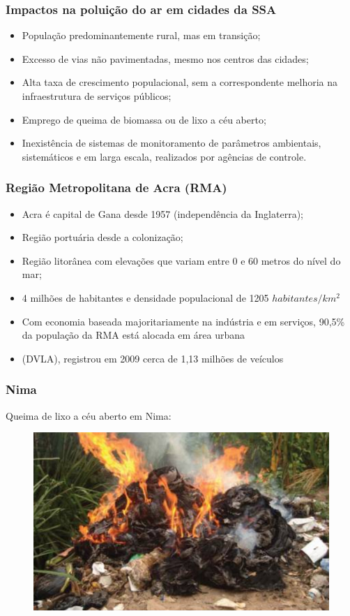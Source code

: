 \begin{frame}
  \frametitle{Impactos na poluição do ar em cidades da SSA}
  \begin{itemize}
    \item População predominantemente rural, mas em transição;
    \item Excesso de vias não pavimentadas, mesmo nos centros das cidades;
    \item Alta taxa de crescimento populacional, sem a correspondente melhoria 
        na infraestrutura de serviços públicos;
    \item Emprego de queima de biomassa ou de lixo a céu aberto;
    \item Inexistência de sistemas de monitoramento de parâmetros ambientais, sistemáticos e em larga escala,
        realizados por agências de controle.
  \end{itemize}
\end{frame}

\begin{frame}
	\frametitle{Região Metropolitana de Acra (RMA)}
	  \begin{itemize}
	  	\item Acra é capital de Gana desde 1957 (independência da Inglaterra);
	  	\item Região portuária desde a colonização;
	  	\item Região litorânea com elevações que variam entre 0 e 60 metros do nível do mar;
	  	\item 4 milhões de habitantes e densidade populacional de 	  	1205 $habitantes/km^2$
	  	\item Com economia baseada majoritariamente na indústria e em serviços, 90,5\% da 
	  	população da RMA está alocada em área urbana
	  	\item (DVLA), registrou em 2009 cerca de 1,13
	  	milhões de veículos
	  	
	  \end{itemize}
\end{frame}

\begin{frame}
  \frametitle{Nima}
  \begin{center}
  Queima de lixo a céu aberto em Nima:
  \end{center}
  \begin{figure}[H]
    \centering
      \includegraphics[width=0.5\linewidth]{../../inputs/images/zheng/arku3.jpeg}
  \end{figure} 
\end{frame}

